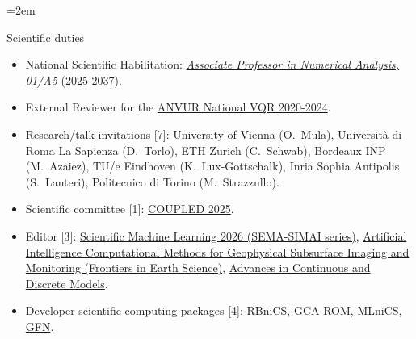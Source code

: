 \documentclass[
  usegeometry%
]{scrartcl}
\newcommand{\Description}[1]{\hangindent=2em\hangafter=0\noindent\raggedright\footnotesize{#1}\par\normalsize\vspace{1em}} %
\begin{document}
\begin{cv}{}
\Description{{\color{cyan} Scientific duties}
\begin{itemize}
    \item[$\circ$] National Scientific Habilitation: \href{https://asn23.cineca.it/pubblico/miur/esito-abilitato/01\%252FA5/2/5}{\textit{Associate Professor in Numerical Analysis, 01/A5}} (2025-2037).
    \item[$\circ$]  External Reviewer for the \href{https://www.anvur.it/en/news-and-events/notice-no-92025-selection-experts-external-reviewers-2020-2024-evaluation-research}{ANVUR National VQR 2020-2024}.
    \item[$\circ$] Research/talk invitations [7]: University of Vienna (O.\ Mula), Università di Roma La Sapienza (D.\ Torlo), ETH Zurich (C.\ Schwab), Bordeaux INP (M.\ Azaiez), TU/e Eindhoven (K.\ Lux-Gottschalk), Inria Sophia Antipolis (S.\ Lanteri), Politecnico di Torino (M.\ Strazzullo).
    \item[$\circ$] Scientific committee [1]:  \href{https://coupled2025.cimne.com}{COUPLED 2025}.
    \item[$\circ$] Editor [3]: \href{https://link.springer.com/book/10.1007/978-3-032-11527-0}{Scientific Machine Learning 2026 (SEMA-SIMAI series)}, \href{https://www.frontiersin.org/research-topics/71314/artificial-intelligence-computational-methods-for-geophysical-subsurface-imaging-and-monitoring}{Artificial Intelligence Computational Methods for Geophysical Subsurface Imaging and Monitoring (Frontiers in Earth Science)}, \href{https://link.springer.com/collections/jfajjbiajd}{Advances in Continuous and Discrete Models}.
    \item[$\circ$] Developer scientific computing packages [4]: \href{https://github.com/RBniCS/RBniCS}{RBniCS}, \href{https://github.com/fpichi/gca-rom}{GCA-ROM}, \href{https://github.com/MLniCS/MLniCS}{MLniCS}, \href{https://github.com/Oisin-M/GFN}{GFN}. 

\end{itemize}}
\end{cv}
\end{document}

